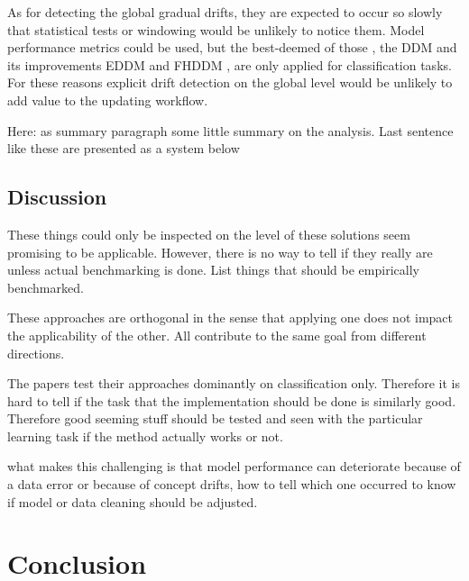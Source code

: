 As for detecting the global gradual drifts, they are expected to occur so slowly that statistical tests or windowing would be unlikely to notice them. Model performance metrics could be used, but the best-deemed of those \cite{celikAdaptationStrategiesAutomated2021} \cite{madridAutoMLPresenceDrift2019}, the DDM \cite{gamaLearningDriftDetection2004} and its improvements EDDM \cite{baena-garciaEarlyDriftDetection2006} and FHDDM \cite{pesaranghaderFastHoeffdingDrift2016}, are only applied for classification tasks. For these reasons explicit drift detection on the global level would be unlikely to add value to the updating workflow. 


Here: as summary paragraph some little summary on the analysis. Last sentence like these are presented as a system below

\section{Discussion}

These things could only be inspected on the level of these solutions seem promising to be applicable. However, there is no way to tell if they really are unless actual benchmarking is done. List things that should be empirically benchmarked.

These approaches are orthogonal in the sense that applying one does not impact the applicability of the other. All contribute to the same goal from different directions.

The papers test their approaches dominantly on classification only. Therefore it is hard to tell if the task that the implementation should be done is similarly good. Therefore good seeming stuff should be tested and seen with the particular learning task if the method actually works or not.

what makes this challenging is that model performance can deteriorate because of a data error or because of concept drifts, how to tell which one occurred to know if model or data cleaning should be adjusted.

\chapter{Conclusion}


